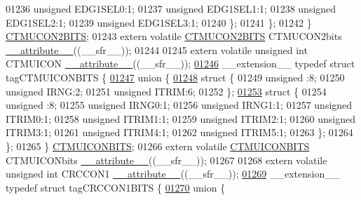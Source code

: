\begin{DoxyCode}
01236       \textcolor{keywordtype}{unsigned} EDG1SEL0:1;
01237       \textcolor{keywordtype}{unsigned} EDG1SEL1:1;
01238       \textcolor{keywordtype}{unsigned} EDG1SEL2:1;
01239       \textcolor{keywordtype}{unsigned} EDG1SEL3:1;
01240     \};
01241   \};
01242 \} \hyperlink{a00014_d2/d3e/a00366}{CTMUCON2BITS};
01243 \textcolor{keyword}{extern} \textcolor{keyword}{volatile} \hyperlink{a00014_d2/d3e/a00366}{CTMUCON2BITS} CTMUCON2bits \hyperlink{a00015_a493c46f03454991ccc5aa7a6e1dfb2a7}{\_\_attribute\_\_}((\_\_sfr\_\_));
01244 
01245 \textcolor{keyword}{extern} \textcolor{keyword}{volatile} \textcolor{keywordtype}{unsigned} \textcolor{keywordtype}{int}  CTMUICON \hyperlink{a00015_a493c46f03454991ccc5aa7a6e1dfb2a7}{\_\_attribute\_\_}((\_\_sfr\_\_));
\hypertarget{a00015_source_l01246}{}\hyperlink{a00014}{01246} \_\_extension\_\_ \textcolor{keyword}{typedef} \textcolor{keyword}{struct }tagCTMUICONBITS \{
\hypertarget{a00015_source_l01247}{}\hyperlink{a00015}{01247}   \textcolor{keyword}{union }\{
\hypertarget{a00015_source_l01248}{}\hyperlink{a00015}{01248}     \textcolor{keyword}{struct }\{
01249       \textcolor{keywordtype}{unsigned} :8;
01250       \textcolor{keywordtype}{unsigned} IRNG:2;
01251       \textcolor{keywordtype}{unsigned} ITRIM:6;
01252     \};
\hypertarget{a00015_source_l01253}{}\hyperlink{a00015}{01253}     \textcolor{keyword}{struct }\{
01254       \textcolor{keywordtype}{unsigned} :8;
01255       \textcolor{keywordtype}{unsigned} IRNG0:1;
01256       \textcolor{keywordtype}{unsigned} IRNG1:1;
01257       \textcolor{keywordtype}{unsigned} ITRIM0:1;
01258       \textcolor{keywordtype}{unsigned} ITRIM1:1;
01259       \textcolor{keywordtype}{unsigned} ITRIM2:1;
01260       \textcolor{keywordtype}{unsigned} ITRIM3:1;
01261       \textcolor{keywordtype}{unsigned} ITRIM4:1;
01262       \textcolor{keywordtype}{unsigned} ITRIM5:1;
01263     \};
01264   \};
01265 \} \hyperlink{a00014_df/dee/a00369}{CTMUICONBITS};
01266 \textcolor{keyword}{extern} \textcolor{keyword}{volatile} \hyperlink{a00014_df/dee/a00369}{CTMUICONBITS} CTMUICONbits \hyperlink{a00015_a493c46f03454991ccc5aa7a6e1dfb2a7}{\_\_attribute\_\_}((\_\_sfr\_\_));
01267 
01268 \textcolor{keyword}{extern} \textcolor{keyword}{volatile} \textcolor{keywordtype}{unsigned} \textcolor{keywordtype}{int}  CRCCON1 \hyperlink{a00015_a493c46f03454991ccc5aa7a6e1dfb2a7}{\_\_attribute\_\_}((\_\_sfr\_\_));
\hypertarget{a00015_source_l01269}{}\hyperlink{a00014}{01269} \_\_extension\_\_ \textcolor{keyword}{typedef} \textcolor{keyword}{struct }tagCRCCON1BITS \{
\hypertarget{a00015_source_l01270}{}\hyperlink{a00015}{01270}   \textcolor{keyword}{union }\{

\end{DoxyCode}
